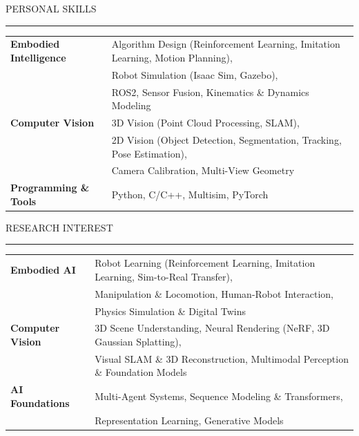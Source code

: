 \documentclass{resume} %
\renewenvironment{rSection}[1]{
\sectionskip
\textcolor{TsinghuaPurple}{\MakeUppercase{#1}}
\sectionlineskip
\hrule
\begin{list}{}{
\setlength{\leftmargin}{0em}
}
\item[]
}{
\end{list}
}
\begin{document}
\begin{rSection}{Personal Skills}

\begin{tabular}{ @{} >{\bfseries}l @{\hspace{6ex}} l }
Embodied Intelligence & Algorithm Design (Reinforcement Learning, Imitation Learning, Motion Planning), \\& Robot Simulation (Isaac Sim, Gazebo), \\& ROS2, Sensor Fusion, Kinematics \& Dynamics Modeling\\
Computer Vision & 3D Vision (Point Cloud Processing, SLAM), \\& 2D Vision (Object Detection, Segmentation, Tracking, Pose Estimation), \\& Camera Calibration, Multi-View Geometry\\
Programming \& Tools & Python, C/C++, Multisim, PyTorch \\
\end{tabular}

\end{rSection}


\begin{rSection}{Research Interest}

\begin{tabular}{ @{} >{\bfseries}l @{\hspace{6ex}} l }
Embodied AI & Robot Learning (Reinforcement Learning, Imitation Learning, Sim-to-Real Transfer), \\& Manipulation \& Locomotion, Human-Robot Interaction, \\& Physics Simulation \& Digital Twins\\
Computer Vision & 3D Scene Understanding, Neural Rendering (NeRF, 3D Gaussian Splatting), \\& Visual SLAM \& 3D Reconstruction, Multimodal Perception \& Foundation Models\\
AI Foundations & Multi-Agent Systems, Sequence Modeling \& Transformers, \\& Representation Learning, Generative Models\\

\end{tabular}

\end{rSection}
\end{document}
